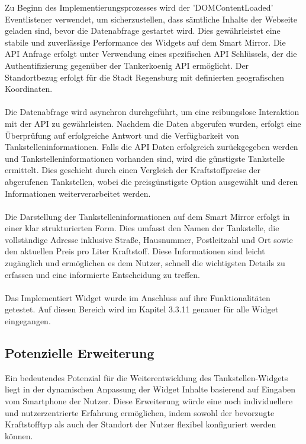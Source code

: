 \noindent
Zu Beginn des Implementierungsprozesses wird der 'DOMContentLoaded' Eventlistener verwendet, um sicherzustellen, dass sämtliche Inhalte der Webseite geladen sind, bevor die Datenabfrage gestartet wird. Dies gewährleistet eine stabile und zuverlässige Performance des Widgets auf dem Smart Mirror. Die API Anfrage erfolgt unter Verwendung eines spezifischen API Schlüssels, der die Authentifizierung gegenüber der Tankerkoenig API ermöglicht. Der Standortbezug erfolgt für die Stadt Regensburg mit definierten geografischen Koordinaten. \\ \\
\noindent
Die Datenabfrage wird asynchron durchgeführt, um eine reibungslose Interaktion mit der API zu gewährleisten. Nachdem die Daten abgerufen wurden, erfolgt eine Überprüfung auf erfolgreiche Antwort und die Verfügbarkeit von Tankstelleninformationen. Falls die API Daten erfolgreich zurückgegeben werden und Tankstelleninformationen vorhanden sind, wird die günstigste Tankstelle ermittelt. Dies geschieht durch einen Vergleich der Kraftstoffpreise der abgerufenen Tankstellen, wobei die preisgünstigste Option ausgewählt und deren Informationen weiterverarbeitet werden. \\ \\
\noindent
Die Darstellung der Tankstelleninformationen auf dem Smart Mirror erfolgt in einer klar strukturierten Form. Dies umfasst den Namen der Tankstelle, die vollständige Adresse inklusive Straße, Hausnummer, Postleitzahl und Ort sowie den aktuellen Preis pro Liter Kraftstoff. Diese Informationen sind leicht zugänglich und ermöglichen es dem Nutzer, schnell die wichtigsten Details zu erfassen und eine informierte Entscheidung zu treffen. \\ \\
\noindent
Das Implementiert Widget wurde im Anschluss auf ihre Funktionalitäten getestet. Auf diesen Bereich wird im Kapitel 3.3.11 genauer für alle Widget eingegangen.

\subsection{Potenzielle Erweiterung}
Ein bedeutendes Potenzial für die Weiterentwicklung des Tankstellen-Widgets liegt in der dynamischen Anpassung der Widget Inhalte basierend auf Eingaben vom Smartphone der Nutzer. Diese Erweiterung würde eine noch individuellere und nutzerzentrierte Erfahrung ermöglichen, indem sowohl der bevorzugte Kraftstofftyp als auch der Standort der Nutzer flexibel konfiguriert werden können.

